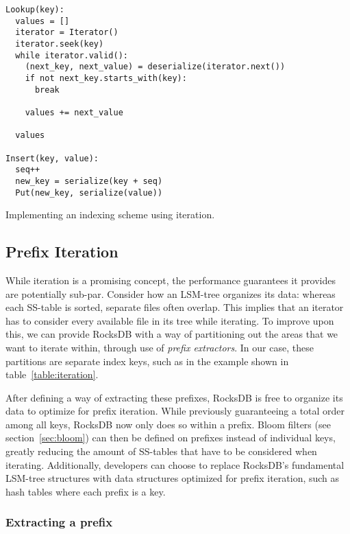 \begin{listing}[H]
  \begin{verbatim}
Lookup(key):
  values = []
  iterator = Iterator()
  iterator.seek(key)
  while iterator.valid():
    (next_key, next_value) = deserialize(iterator.next())
    if not next_key.starts_with(key):
      break

    values += next_value

  values

Insert(key, value):
  seq++
  new_key = serialize(key + seq)
  Put(new_key, serialize(value))
  \end{verbatim}

  \caption{Implementing an indexing scheme using iteration.}\label{lst:iteration-example}
\end{listing}


\subsection{Prefix Iteration}\label{sec:prefix-iteration}

While iteration is a promising concept, the performance guarantees it provides
are potentially sub-par. Consider how an LSM-tree organizes its data: whereas
each SS-table is sorted, separate files often overlap. This implies that an
iterator has to consider every available file in its tree while iterating. To
improve upon this, we can provide RocksDB with a way of partitioning out the
areas that we want to iterate within, through use of \textit{prefix
extractors}. In our case, these partitions are separate index keys, such as
 in the example shown in table~\ref{table:iteration}.

After defining a way of extracting these prefixes, RocksDB is free to organize
its data to optimize for prefix iteration. While previously guaranteeing a total
order among all keys, RocksDB now only does so within a prefix. Bloom filters
(see section~\ref{sec:bloom}) can then be defined on prefixes instead of
individual keys, greatly reducing the amount of SS-tables that have to be
considered when iterating. Additionally, developers can choose to replace
RocksDB's fundamental LSM-tree structures with data structures optimized for
prefix iteration, such as hash tables where each prefix is a key.

\subsubsection{Extracting a prefix}


